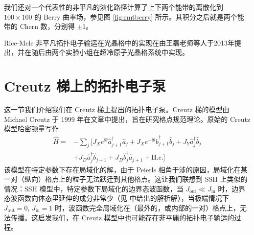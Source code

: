 我们还对一个代表性的非平凡的演化路径计算了上下两个能带的离散化到 $100\times100$ 的 Berry 曲率场，参见图 \ref{fig:rmtberry} 所示。其积分之后就是两个能带的 Chern 数，分别得 $\pm1$。

Rice-Mele 非平凡拓扑电子输运在光晶格中的实现在由王磊老师等人于2013年提出，并在随后由两个实验小组在超冷原子光晶格系统中实现。





\section{ Creutz 梯上的拓扑电子泵}\label{sec:creutz}
这一节我们介绍我们在 Creutz 梯上提出的拓扑电子泵。Creutz 梯的模型由 Michael Creutz 于 1999 年在文章中提出，旨在研究格点规范理论。原始的 Creutz 模型哈密顿量写作
\begin{align}
\hat{H} =&-\sum_{j} [J_X e^{\ii\theta} \hat{a}_{j+1}^\dag \hat{a}_{j}+J_X e^{-\ii\theta} \hat{b}_{j+1}^\dag \hat{b}_{j} + J_Y \hat{a}_j^\dag \hat{b}_j 
\nonumber\\
&+ J_D \hat{a}_j^\dag \hat{b}_{j+1}+J_D \hat{b}_j^\dag \hat{a}_{j+1} +\textrm{H.c.}]
\end{align}
该模型在特定参数下存在局域化的解，由于 Peierls 相角干涉的原因，局域化在某一对（纵向）格点上的粒子无法跃迁到其他格点\cite{creutz1999}。这让我们联想到 SSH 上类似的情况：SSH 模型中，特定参数下局域化的边界态波函数，当 $J_{\text{out}}\ll J_{\text{in}}$ 时，边界态波函数向体态里延伸的成分非常少（见  中给出的解析解），当极端情况下 $J_{\text{out}}=0$, $J_{\text{in}}=1$ 时，波函数完全局域化在（最外的，或内部的一对）格点上，无法传播。这启发我们，在 Creutz 模型中也可能存在非平庸的拓扑电子输运的过程。

